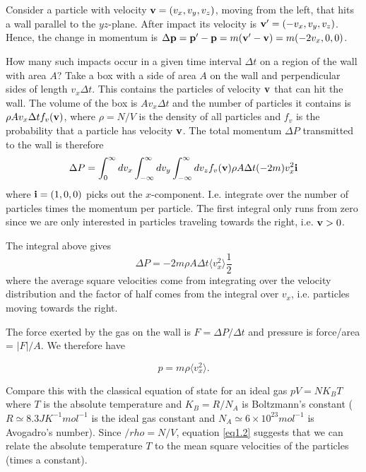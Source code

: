 Consider a particle with velocity ${\bf v} = (v_x,v_y,v_z)$, moving from the left, that hits a wall parallel to the $yz$-plane. After impact its velocity is ${\bf v'}=(-v_x,v_y,v_z)$. Hence, the change in momentum is $\Delta {\bf p}= {\bf p'} - {\bf p} = m({\bf v'}-{\bf v}) = m(-2v_x,0,0)$.

How many such impacts occur in a given time interval $\Delta t$ on a region of the wall with area $A$? 
Take a box with a side of area $A$ on the wall and perpendicular sides of length $v_x\Delta t$. This contains the particles of velocity ${\bf v}$ that can hit the wall. The volume of the box is $Av_x\Delta t$ and the number of particles it contains is $\rho Av_x\Delta t f_v({\bf v})$, where $\rho=N/V$ is the density of all particles  and $f_v$ is the probability that a particle has velocity $\bf v$.
The total momentum $\Delta P$ transmitted to the wall is therefore
$$\Delta P =\int_0^\infty dv_x \int_{-\infty}^\infty dv_y \int_{-\infty}^\infty dv_z f_v({\bf v})\rho A\Delta t(-2m)v_x^2{\bf i}$$
where ${\bf i} =(1,0,0)$ picks out the $x$-component. I.e. integrate over the number of particles times the momentum per particle. The first integral only runs from zero since we are only interested in particles traveling towards the right, i.e. ${\bf v}>0$.

The integral above gives 
$$\Delta P = -2m\rho A\Delta t \langle v_x^2\rangle\frac12$$ where the average square velocities come from integrating over the velocity distribution and the factor of half comes from the integral over $v_x$, i.e. particles moving towards the right.

The force exerted by the gas on the wall is $F=\Delta P/\Delta t$ and pressure is force/area = $|F|/A$.
We therefore have 

\begin{equation}
	p=m\rho  \langle v_x^2\rangle.
	\label{eq1.2}
\end{equation}
 
Compare this with the classical equation of state for an ideal gas $pV=NK_BT$ where $T$ is the absolute temperature and $K_B=R/N_A$ is Boltzmann's constant ($R\simeq8.3JK^{-1}mol^{-1}$ is the ideal gas constant and $N_A\simeq6\times10^{23}mol^{-1}$ is Avogadro's number). Since $/rho = N/V$, equation \ref{eq1.2} suggests that we can relate the absolute temperature $T$ to the mean square velocities of the particles (times a constant).


